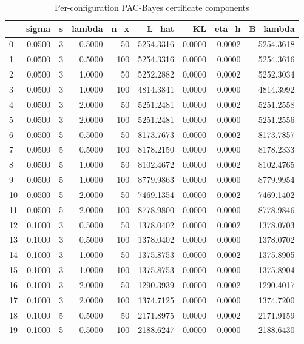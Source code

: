 \begin{table}
\caption{Per-configuration PAC-Bayes certificate components}
\label{tab:results}
\begin{tabular}{lrrrrrrrr}
\toprule
 & sigma & s & lambda & n_x & L_hat & KL & eta_h & B_lambda \\
\midrule
0 & 0.0500 & 3 & 0.5000 & 50 & 5254.3316 & 0.0000 & 0.0002 & 5254.3618 \\
1 & 0.0500 & 3 & 0.5000 & 100 & 5254.3316 & 0.0000 & 0.0000 & 5254.3616 \\
2 & 0.0500 & 3 & 1.0000 & 50 & 5252.2882 & 0.0000 & 0.0002 & 5252.3034 \\
3 & 0.0500 & 3 & 1.0000 & 100 & 4814.3841 & 0.0000 & 0.0000 & 4814.3992 \\
4 & 0.0500 & 3 & 2.0000 & 50 & 5251.2481 & 0.0000 & 0.0002 & 5251.2558 \\
5 & 0.0500 & 3 & 2.0000 & 100 & 5251.2481 & 0.0000 & 0.0000 & 5251.2556 \\
6 & 0.0500 & 5 & 0.5000 & 50 & 8173.7673 & 0.0000 & 0.0002 & 8173.7857 \\
7 & 0.0500 & 5 & 0.5000 & 100 & 8178.2150 & 0.0000 & 0.0000 & 8178.2333 \\
8 & 0.0500 & 5 & 1.0000 & 50 & 8102.4672 & 0.0000 & 0.0002 & 8102.4765 \\
9 & 0.0500 & 5 & 1.0000 & 100 & 8779.9863 & 0.0000 & 0.0000 & 8779.9954 \\
10 & 0.0500 & 5 & 2.0000 & 50 & 7469.1354 & 0.0000 & 0.0002 & 7469.1402 \\
11 & 0.0500 & 5 & 2.0000 & 100 & 8778.9800 & 0.0000 & 0.0000 & 8778.9846 \\
12 & 0.1000 & 3 & 0.5000 & 50 & 1378.0402 & 0.0000 & 0.0002 & 1378.0703 \\
13 & 0.1000 & 3 & 0.5000 & 100 & 1378.0402 & 0.0000 & 0.0000 & 1378.0702 \\
14 & 0.1000 & 3 & 1.0000 & 50 & 1375.8753 & 0.0000 & 0.0002 & 1375.8905 \\
15 & 0.1000 & 3 & 1.0000 & 100 & 1375.8753 & 0.0000 & 0.0000 & 1375.8904 \\
16 & 0.1000 & 3 & 2.0000 & 50 & 1290.3939 & 0.0000 & 0.0002 & 1290.4017 \\
17 & 0.1000 & 3 & 2.0000 & 100 & 1374.7125 & 0.0000 & 0.0000 & 1374.7200 \\
18 & 0.1000 & 5 & 0.5000 & 50 & 2171.8975 & 0.0000 & 0.0002 & 2171.9159 \\
19 & 0.1000 & 5 & 0.5000 & 100 & 2188.6247 & 0.0000 & 0.0000 & 2188.6430 \\

\end{tabular}
\end{table}
